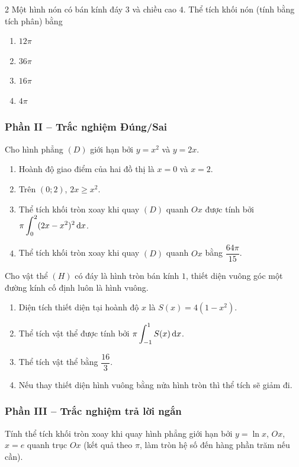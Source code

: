 \begin{multicols}{2}
\cauhoi Một hình nón có bán kính đáy $3$ và chiều cao $4$. Thể tích khối nón (tính bằng tích phân) bằng
\begin{enumerate}[label=\textbf{\Alph*.}, leftmargin=0.9cm]
  \item $12\pi$
  \item $36\pi$
  \item $16\pi$
  \item $4\pi$
\end{enumerate}
\end{multicols}

\subsubsection*{Phần II -- Trắc nghiệm Đúng/Sai}

\cauhoi Cho hình phẳng $(D)$ giới hạn bởi $y=x^2$ và $y=2x$.
\begin{enumerate}[label=\textbf{\alph*)}, leftmargin=1cm]
  \item Hoành độ giao điểm của hai đồ thị là $x=0$ và $x=2$.
  \item Trên $(0;2)$, $2x\ge x^2$.
  \item Thể tích khối tròn xoay khi quay $(D)$ quanh $Ox$ được tính bởi $\pi\displaystyle\int_0^2(2x-x^2)^2\,\mathrm{d}x$.
  \item Thể tích khối tròn xoay khi quay $(D)$ quanh $Ox$ bằng $\dfrac{64\pi}{15}$.
\end{enumerate}

\cauhoi Cho vật thể $(H)$ có đáy là hình tròn bán kính $1$, thiết diện vuông góc một đường kính cố định luôn là hình vuông.
\begin{enumerate}[label=\textbf{\alph*)}, leftmargin=1cm]
  \item Diện tích thiết diện tại hoành độ $x$ là $S(x)=4(1-x^2)$.
  \item Thể tích vật thể được tính bởi $\pi\displaystyle\int_{-1}^1 S(x)\,\mathrm{d}x$.
  \item Thể tích vật thể bằng $\dfrac{16}{3}$.
  \item Nếu thay thiết diện hình vuông bằng nửa hình tròn thì thể tích sẽ giảm đi.
\end{enumerate}

\subsubsection*{Phần III -- Trắc nghiệm trả lời ngắn}

\cauhoi Tính thể tích khối tròn xoay khi quay hình phẳng giới hạn bởi $y=\ln x$, $Ox$, $x=e$ quanh trục $Ox$ (kết quả theo $\pi$, làm tròn hệ số đến hàng phần trăm nếu cần).

